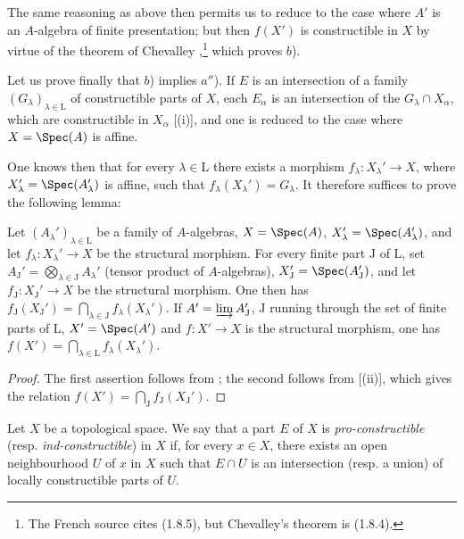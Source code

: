 The same reasoning as above then permits us to reduce to the case where $A'$ is an $A$-algebra of finite presentation; but then $f(X')$ is constructible in $X$ by virtue of the theorem of Chevalley ,\footnote{The French source cites (1.8.5), but Chevalley's theorem is (1.8.4).} which proves $b$).

Let us prove finally that $b$) implies $a''$).
If $E$ is an intersection of a family $(G_\lambda)_{\lambda\in\mathrm{L}}$ of constructible parts of $X$, each $E_\alpha$ is an intersection of the $G_\lambda\cap X_\alpha$, which are constructible in $X_\alpha$ [(i)], and one is reduced to the case where $X=\Spec(A)$ is affine.

One knows then  that for every $\lambda\in\mathrm{L}$ there exists a morphism $f_\lambda:X_\lambda'\to X$, where $X_\lambda'=\Spec(A_\lambda')$ is affine, such that $f_\lambda(X_\lambda')=G_\lambda$.
It therefore suffices to prove the following lemma:

\begin{lemma}[1.9.3.2]
\label{IV.1.9.3.2}
Let $(A_\lambda')_{\lambda\in\mathrm{L}}$ be a family of $A$-algebras, $X=\Spec(A)$, $X_\lambda'=\Spec(A_\lambda')$, and let $f_\lambda:X_\lambda'\to X$ be the structural morphism.
For every finite part $\mathrm{J}$ of $\mathrm{L}$, set $A_\mathrm{J}'=\bigotimes_{\lambda\in\mathrm{J}} A_\lambda'$ (tensor product of $A$-algebras), $X_\mathrm{J}'=\Spec(A_\mathrm{J}')$, and let $f_\mathrm{J}:X_\mathrm{J}'\to X$ be the structural morphism.
One then has $f_\mathrm{J}(X_\mathrm{J}')=\bigcap_{\lambda\in\mathrm{J}} f_\lambda(X_\lambda')$.
If $A'=\varinjlim A_\mathrm{J}'$, $\mathrm{J}$ running through the set of finite parts of $\mathrm{L}$, $X'=\Spec(A')$ and $f:X'\to X$ is the structural morphism, one has $f(X')=\bigcap_{\lambda\in\mathrm{L}} f_\lambda(X_\lambda')$.
\end{lemma}

\begin{proof}
The first assertion follows from ; the second follows from [(ii)], which gives the relation $f(X')=\bigcap_\mathrm{J} f_\mathrm{J}(X_\mathrm{J}')$.
\end{proof}

\begin{definition}[1.9.4]
\label{IV.1.9.4}
Let $X$ be a topological space.
We say that a part $E$ of $X$ is \emph{pro-constructible} (resp. \emph{ind-constructible}) in $X$ if, for every $x\in X$, there exists an open neighbourhood $U$ of $x$ in $X$ such that $E\cap U$ is an intersection (resp. a union) of locally constructible parts of $U$.
\end{definition}

